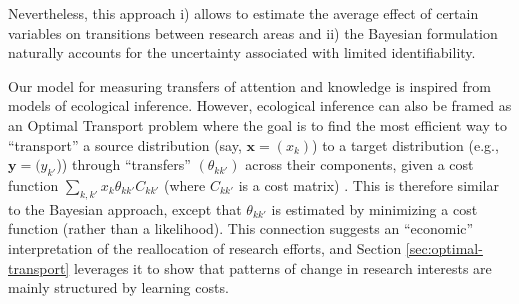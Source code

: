 \documentclass{article}
\begin{document}
Nevertheless, this approach i) allows to estimate the average effect of certain variables on transitions between research areas and ii) the Bayesian formulation naturally accounts for the uncertainty associated with limited identifiability.

Our model for measuring transfers of attention and knowledge is inspired from models of ecological inference. However, ecological inference can also be framed as an Optimal Transport problem \citep{muzellec2017tsallis,li2019learning} where the goal is to find the most efficient way to  ``transport'' a source distribution (say, $\bm{x}=(x_k)$) to a target distribution (e.g., $\bm{y}=(y_{k'}$)) through ``transfers'' $(\theta_{kk'})$ across their components, given a cost function $\sum_{k,k'} x_{k} \theta_{kk'}C_{kk'}$ (where $C_{kk'}$ is a cost matrix) \citep{Peyre2018}. This is therefore similar to the Bayesian approach, except that $\theta_{kk'}$ is estimated by minimizing a cost function (rather than a likelihood). This connection suggests an ``economic'' interpretation of the reallocation of research efforts, and Section \ref{sec:optimal-transport} leverages it to show that patterns of change in research interests are mainly structured by learning costs. %


\end{document}
